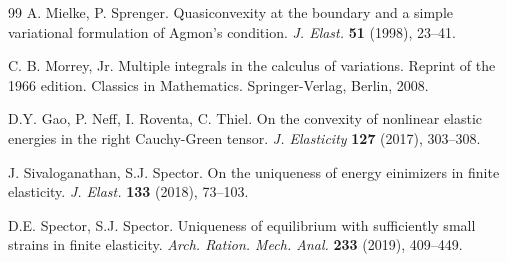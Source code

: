 \documentclass[12pt]{amsart}
\newcommand{\1}{{\bf 1}}
\begin{document}
\begin{thebibliography}{99}
A. Mielke, P. Sprenger. Quasiconvexity at the boundary and a simple variational formulation of Agmon's condition. {\it J. Elast.} {\bf 51} (1998),  23--41.


  C. B. Morrey, Jr.  Multiple integrals in the calculus of variations. Reprint of the 1966 edition. Classics in Mathematics. Springer-Verlag, Berlin, 2008. 

D.Y. Gao, P. Neff, I. Roventa, C. Thiel. On the convexity of nonlinear elastic energies in  the right Cauchy-Green tensor. {\it J. Elasticity} {\bf 127} (2017), 303--308.


J. Sivaloganathan, S.J. Spector. On the uniqueness of energy einimizers in finite elasticity. {\it J. Elast.} {\bf 133} (2018), 73--103. 

D.E. Spector, S.J. Spector. Uniqueness of equilibrium with sufficiently small strains in finite elasticity. {\it Arch. Ration. Mech. Anal.} {\bf 233} (2019), 409--449.\ 
\end{thebibliography}
\nocite{*}

%
\end{document}
